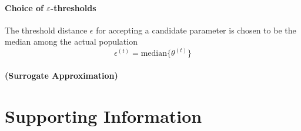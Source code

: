 \documentclass[10pt,letterpaper]{article}
\begin{document}
\paragraph{Choice of $\varepsilon$-thresholds} The threshold distance $\epsilon$ for accepting a candidate parameter is chosen to be the median among the actual population 
\begin{equation}
	\epsilon^{(t)} = \text{median} \{ \theta^{(t)} \}
\end{equation}


\paragraph{(Surrogate Approximation)}


\section*{Supporting Information}

%
%
%
%
\end{document}
